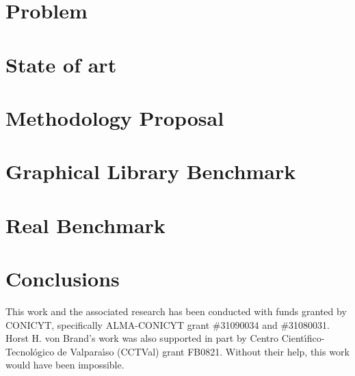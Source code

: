 \documentclass[]{styles/spie}  %
\begin{document}
\section{Problem}
\label{sec:problem}

\section{State of art}
\label{sec:state}

\section{Methodology Proposal}
\label{sec:method}

\section{Graphical Library Benchmark}
\label{sec:gbenchmark}

\section{Real Benchmark}
\label{sec:benchmark}

\section{Conclusions}
\label{sec:conclusions}


\appendix    %

\acknowledgments     %

This work and the associated research has been conducted with funds granted by CONICYT, specifically ALMA-CONICYT grant \#31090034 and \#31080031.
Horst H. von Brand's work was also supported in part
by Centro Cient\'\i fico-Tecnol\'ogico de Valpara\'\i so (CCTVal) grant FB0821.
Without their help, this work would have been impossible.

\hfill
\end{document}
